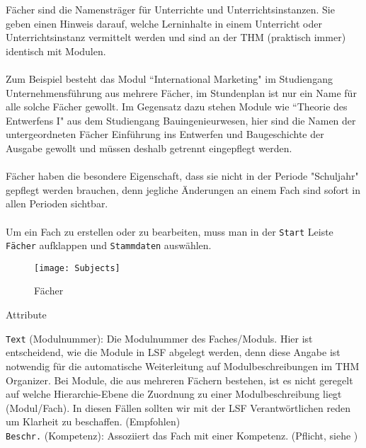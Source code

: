 Fächer sind die Namensträger für Unterrichte und Unterrichtsinstanzen. Sie geben einen Hinweis darauf, welche Lerninhalte in einem Unterricht oder Unterrichtsinstanz vermittelt werden und sind an der THM (praktisch immer) identisch mit Modulen.\\
\\
Zum Beispiel besteht das Modul ``International Marketing" \hspace{1pt} im Studiengang Unternehmensführung aus mehrere Fächer, im Stundenplan ist nur ein Name für alle solche Fächer gewollt. Im Gegensatz dazu stehen Module wie ``Theorie des Entwerfens I" \hspace{1pt} aus dem Studiengang Bauingenieurwesen, hier sind die Namen der untergeordneten Fächer Einführung ins Entwerfen und Baugeschichte der Ausgabe gewollt und müssen deshalb getrennt eingepflegt werden.\\
\\ 
Fächer haben die besondere Eigenschaft, dass sie nicht in der Periode "Schuljahr" gepflegt werden brauchen, denn jegliche Änderungen an einem Fach sind sofort in allen Perioden sichtbar.\\
\\
Um ein Fach zu erstellen oder zu bearbeiten, muss man in der \texttt{Start} Leiste \texttt{Fächer} aufklappen und \texttt{Stammdaten} auswählen.

\begin{figure}[h]
	\centering
	\texttt{[image: Subjects]}
	\vspace{-5pt}
	\caption{Fächer}
	\label{fig:subjects}
\end{figure}

\noindent
{\large Attribute\par}
\vspace{8pt}

\noindent
\texttt{Text} (Modulnummer): Die Modulnummer des Faches/Moduls. Hier ist entscheidend, wie die Module in LSF abgelegt werden, denn diese Angabe ist notwendig für die automatische Weiterleitung auf Modulbeschreibungen im THM Organizer. Bei Module, die aus mehreren Fächern bestehen, ist es nicht geregelt auf welche Hierarchie-Ebene die Zuordnung zu einer Modulbeschreibung liegt (Modul/Fach). In diesen Fällen sollten wir mit der LSF Verantwörtlichen reden um Klarheit zu beschaffen. (Empfohlen)\\

\noindent
\texttt{Beschr.} (Kompetenz): Assoziiert das Fach mit einer Kompetenz. (Pflicht, siehe )\\

